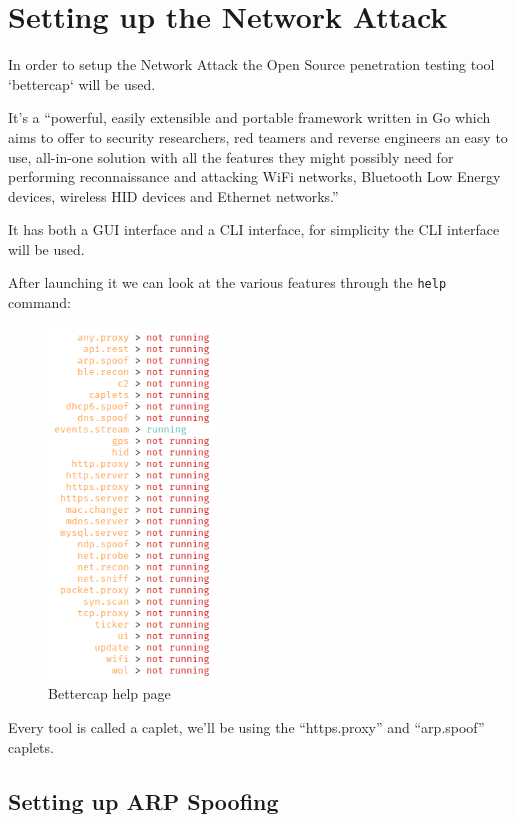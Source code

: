 \newpage

\section{Setting up the Network Attack}

In order to setup the Network Attack the Open Source penetration testing tool `bettercap` will be used.

It's a ``powerful, easily extensible and portable framework written in Go which aims to offer to security researchers, red teamers and reverse engineers an easy to use, all-in-one solution with all the features they might possibly need for performing reconnaissance and attacking WiFi networks, Bluetooth Low Energy devices, wireless HID devices and Ethernet networks.''\cite{bettercap}

It has both a GUI interface and a CLI interface, for simplicity the CLI interface will be used.

After launching it we can look at the various features through the \verb|help| command:

\begin{figure}[h!]
 \centering
 \includegraphics[width=4.5cm]{img/bettercap_help.png}
 \caption{Bettercap help page}
 \label{fig: bettercap help}
\end{figure}

Every tool is called a caplet, we'll be using the ``https.proxy'' and ``arp.spoof'' caplets.

\newpage

\subsection{Setting up ARP Spoofing}

